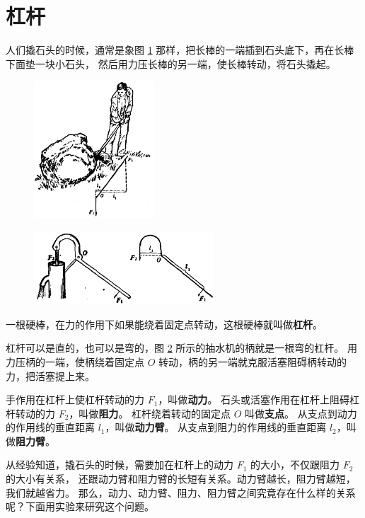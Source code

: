\section{杠杆}\label{sec:7-1}

人们撬石头的时候，通常是象图 \ref{fig:7-1} 那样，把长棒的一端插到石头底下，再在长棒下面垫一块小石头，
然后用力压长棒的另一端，使长棒转动，将石头撬起。

\begin{figure}[htbp]
    \centering
    \includegraphics[width=0.4\textwidth]{../pic/czwl1-ch7-1}
    \caption{}\label{fig:7-1}
\end{figure}

\begin{figure}[htbp]
    \centering
    \includegraphics[width=0.6\textwidth]{../pic/czwl1-ch7-2}
    \caption{}\label{fig:7-2}
\end{figure}

一根硬棒，在力的作用下如果能绕着固定点转动，这根硬棒就叫做\textbf{杠杆}。

杠杆可以是直的，也可以是弯的，图 \ref{fig:7-2} 所示的抽水机的柄就是一根弯的杠杆。
用力压柄的一端，使柄绕着固定点 $O$ 转动，柄的另一端就克服活塞阻碍柄转动的力，把活塞提上来。

手作用在杠杆上使杠杆转动的力 $F_1$，叫做\textbf{动力}。
石头或活塞作用在杠杆上阻碍杠杆转动的力 $F_2$，叫做\textbf{阻力}。
杠杆绕着转动的固定点 $O$ 叫做\textbf{支点}。
从支点到动力的作用线\footnotemark 的垂直距离 $l_1$，叫做\textbf{动力臂}。
从支点到阻力的作用线的垂直距离 $l_2$，叫做\textbf{阻力臂}。


从经验知道，撬石头的时候，需要加在杠杆上的动力 $F_1$ 的大小，不仅跟阻力 $F_2$ 的大小有关系，
还跟动力臂和阻力臂的长短有关系。动力臂越长，阻力臂越短，我们就越省力。
那么，动力、动力臂、阻力、阻力臂之间究竟存在什么样的关系呢？下面用实验来研究这个问题。

